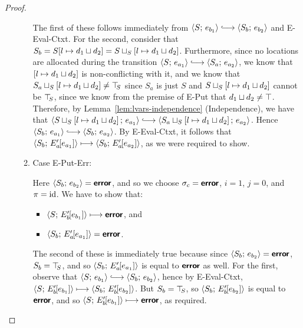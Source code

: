 \begin{proof}
\begin{enumerate}
\begin{enumerate}
      The first of these follows immediately from $\config{S}{e_{b_1}}
      \parstepsto \config{S_b}{e_{b_2}}$ and {\sc E-Eval-Ctxt}.  For
      the second, consider that $S_b =
      S[l \mapsto d_1 \sqcup d_2] =
      S \sqcup_{S} \left[ l \mapsto d_1 \sqcup d_2 \right]$.
      Furthermore, since no locations are allocated during the
      transition $\config{S}{e_{a_1}} \parstepsto
      \config{S_a}{e_{a_2}}$, we know that
      $\left[ l \mapsto d_1 \sqcup d_2 \right]$ is
      non-conflicting with it, and we know that
      $S_a \sqcup_{S} \left[ l \mapsto d_1 \sqcup d_2 \right]
      \neq \top\hspace{-0.85mm}_{S}$ since $S_a$ is just $S$ and
      $S \sqcup_{S} \left[ l \mapsto d_1 \sqcup d_2 \right]$
      cannot be $\top\hspace{-0.85mm}_{S}$, since we know from the premise of {\sc E-Put}
      that $d_1 \sqcup d_2 \neq \top$.  Therefore, by
      Lemma~\ref{lem:lvars-independence} (Independence), we have that
      $\config{\lubstore{S}{\store{\storebindingRaw{l}{\userlub{d_1}{d_2}}}}}{e_{a_1}}
      \parstepsto
      \config{\lubstore{S_a}{\store{\storebindingRaw{l}{\userlub{d_1}{d_2}}}}}{e_{a_2}}$.
      Hence $\config{S_b}{e_{a_1}} \parstepsto \config{S_b}{e_{a_2}}$.
      By {\sc E-Eval-Ctxt}, it follows that
      $\langle S_b;\, E'_a\hspace{-1mm}\left[e_{a_1}\right] \rangle \longmapsto
      \langle S_b;\, E'_a\hspace{-1mm}\left[e_{a_2}\right] \rangle$, as we were required to
      show.

    \item \label{lvars-slc-beta-put-err}Case {\sc E-Put-Err}:

      Here $\langle S_b;\, e_{b_2} \rangle = \textbf{\textsf{error}}$, and so we choose $\sigma_c
      = \textbf{\textsf{error}}$, $i = 1$, $j = 0$, and $\pi = \mathrm{id}$.  We have to show that:
      \begin{itemize}
      \item $\langle S;\, E'_b\hspace{-1mm}\left[e_{b_1}\right] \rangle \longmapsto \textbf{\textsf{error}}$,
        and
      \item
        $\langle S_b;\, E'_a\hspace{-1mm}\left[e_{a_1}\right] \rangle = \textbf{\textsf{error}}$.
      \end{itemize}

      The second of these is immediately true because since
      $\langle S_b;\, e_{b_2} \rangle = \textbf{\textsf{error}}$, $S_b = \top\hspace{-0.85mm}_{S}$, and so
      $\langle S_b;\, E'_a\hspace{-1mm}\left[e_{a_1}\right] \rangle$ is equal to $\textbf{\textsf{error}}$ as
      well.  For the first, observe that $\config{S}{e_{b_1}}
      \parstepsto \config{S_b}{e_{b_2}}$, hence by {\sc E-Eval-Ctxt},
      $\langle S;\, E'_b\hspace{-1mm}\left[e_{b_1}\right] \rangle \longmapsto
      \langle S_b;\, E'_b\hspace{-1mm}\left[e_{b_2}\right] \rangle$.  But $S_b = \top\hspace{-0.85mm}_{S}$, so
      $\langle S_b;\, E'_b\hspace{-1mm}\left[e_{b_2}\right] \rangle$ is equal to $\textbf{\textsf{error}}$,
      and so $\langle S;\, E'_b\hspace{-1mm}\left[e_{b_1}\right] \rangle \longmapsto
      \textbf{\textsf{error}}$, as required.


\end{enumerate}
\end{enumerate}
\end{proof}
